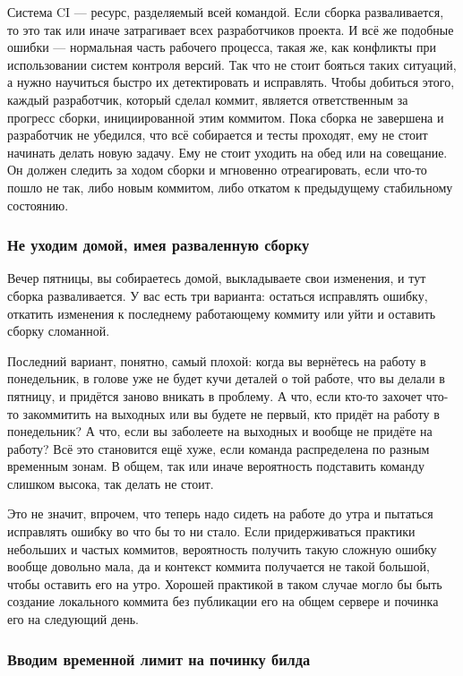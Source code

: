\documentclass{../../text-style}
\begin{document}
Система CI --- ресурс, разделяемый всей командой. Если сборка разваливается, то это так или иначе затрагивает всех разработчиков проекта. И всё же подобные ошибки --- нормальная часть рабочего процесса, такая же, как конфликты при использовании систем контроля версий. Так что не стоит бояться таких ситуаций, а нужно научиться быстро их детектировать и исправлять. Чтобы добиться этого, каждый разработчик, который сделал коммит, является ответственным за прогресс сборки, инициированной этим коммитом. Пока сборка не завершена и разработчик не убедился, что всё собирается и тесты проходят, ему не стоит начинать делать новую задачу. Ему не стоит уходить на обед или на совещание. Он должен следить за ходом сборки и мгновенно отреагировать, если что-то пошло не так, либо новым коммитом, либо откатом к предыдущему стабильному состоянию.

\subsubsection{Не уходим домой, имея разваленную сборку}

Вечер пятницы, вы собираетесь домой, выкладываете свои изменения, и тут сборка разваливается. У вас есть три варианта: остаться исправлять ошибку, откатить изменения к последнему работающему коммиту или уйти и оставить сборку сломанной.

Последний вариант, понятно, самый плохой: когда вы вернётесь на работу в понедельник, в голове уже не будет кучи деталей о той работе, что вы делали в пятницу, и придётся заново вникать в проблему. А что, если кто-то захочет что-то закоммитить на выходных или вы будете не первый, кто придёт на работу в понедельник? А что, если вы заболеете на выходных и вообще не придёте на работу? Всё это становится ещё хуже, если команда распределена по разным временным зонам. В общем, так или иначе вероятность подставить команду слишком высока, так делать не стоит.

Это не значит, впрочем, что теперь надо сидеть на работе до утра и пытаться исправлять ошибку во что бы то ни стало. Если придерживаться практики небольших и частых коммитов, вероятность получить такую сложную ошибку вообще довольно мала, да и контекст коммита получается не такой большой, чтобы оставить его на утро. Хорошей практикой в таком случае могло бы быть создание локального коммита без публикации его на общем сервере и починка его на следующий день.

\subsubsection{Вводим временной лимит на починку билда}
\end{document}
